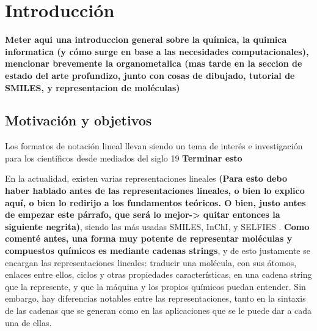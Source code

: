 \chapter{Introducción}





\textbf{Meter aqui una introduccion general sobre la química, la quimica informatica (y cómo surge en base a las necesidades computacionales), mencionar brevemente la organometalica (mas tarde en la seccion de estado del arte profundizo, junto con cosas de dibujado, tutorial de SMILES, y representacion de moléculas)}


\section{Motivación y objetivos}

Los formatos de notación lineal llevan siendo un tema de interés e investigación para los científicos desde mediados del siglo 19 \cite{107_years_linear_notations} \textbf{Terminar esto}

En la actualidad, existen varias representaciones lineales \textbf{(Para esto debo haber hablado antes de las representaciones lineales, o bien lo explico aquí, o bien lo redirijo a los fundamentos teóricos. O bien, justo antes de empezar este párrafo, que será lo mejor-> quitar entonces la siguiente negrita)}, siendo las más usadas SMILES, InChI, y SELFIES \cite{SELFIES}. \textbf{Como comenté antes, una forma muy potente de representar moléculas y compuestos químicos es mediante cadenas strings}, y de esto justamente se encargan las representaciones lineales: traducir una molécula, con sus átomos, enlaces entre ellos, ciclos y otras propiedades características, en una cadena string que la represente, y que la máquina y los propios químicos puedan entender. Sin embargo, hay diferencias notables entre las representaciones, tanto en la sintaxis de las cadenas que se generan como en las aplicaciones que se le puede dar a cada una de ellas.


